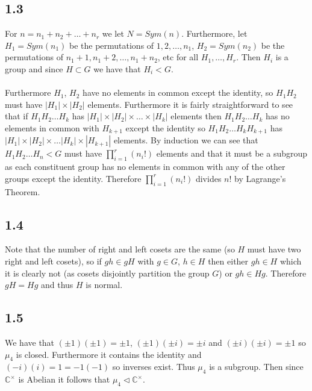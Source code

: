 \documentclass{article}
\begin{document}
\subsection*{1.3}
For $n = n_1 + n_2 + \dots + n_r$ we let $N = Sym(n)$. Furthermore, let $H_1 = Sym(n_1)$ 
be the permutations of $1,2,\dots,n_1$, $H_2 = Sym(n_2)$ be the permutations of $n_1+1,n_1+2,\dots,n_1+n_2$, 
etc for all $H_1, \dots, H_r$. Then $H_i$ is a group and since $H \subset G$ we have that $H_i < G$.

\paragraph{}
Furthermore $H_1$, $H_2$ have no elements in common except the identity, so $H_1H_2$ must have 
$|H_1|\times|H_2|$ elements. Furthermore it is fairly straightforward to see that if $H_1H_2\dots H_k$ has $|H_1|\times |H_2| \times \dots \times |H_k|$ elements 
then $H_1H_2\dots H_k$ has 
no elements in common with $H_{k+1}$ except the identity so $H_1H_2\dots H_kH_{k+1}$ has 
$|H_1|\times |H_2| \times \dots |H_k|\times |H_{k+1}|$ elements. By induction we can see that 
$H_1H_2\dots H_n < G$ must have $\prod_{i=1}^r(n_i!)$ elements and that it must be a subgroup as each 
constituent group has no elements in common with any of the other groups except the identity.
Therefore $\prod_{i=1}^r(n_i!)$ divides $n!$ by Lagrange's Theorem.

\subsection*{1.4}
Note that the number of right and left cosets are the same (so $H$ must have two right and left cosets), so if $gh \in gH$ with $g \in G$, $h \in H$ 
then either $gh \in H$ which it is clearly not (as cosets disjointly partition the group $G$) or 
$gh \in Hg$. Therefore $gH = Hg$ and thus $H$ is normal.

\subsection*{1.5}
We have that $(\pm 1)(\pm 1) = \pm 1$, $(\pm 1)(\pm i) = \pm i$ and $(\pm i)(\pm i) = \pm 1$ so 
$\mu_4$ is closed. Furthermore it contains the identity and $(-i)(i) = 1 = -1(-1)$ so inverses 
exist. Thus $\mu_4$ is a subgroup. Then since $\mathbb{C}^{\times}$ is Abelian it follows that $\mu_4 \triangleleft \mathbb{C}^{\times}$.
\end{document}
